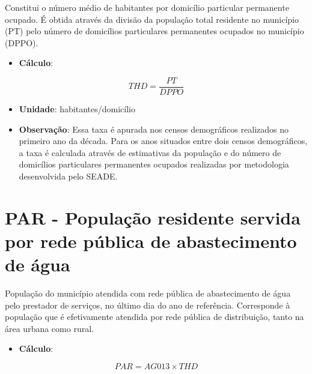 \documentclass[]{book}
\providecommand{\tightlist}{%
  \setlength{\itemsep}{0pt}\setlength{\parskip}{0pt}}
\begin{document}
Constitui o número médio de habitantes por domicílio particular permanente ocupado. É obtida através da divisão da população total residente no município (PT) pelo número de domicílios particulares permanentes ocupados no município (DPPO).

\begin{itemize}
\tightlist
\item
  \textbf{Cálculo}:
\end{itemize}

\[
THD = \frac{PT}{DPPO}
\]

\begin{itemize}
\item
  \textbf{Unidade}: habitantes/domicílio
\item
  \textbf{Observação}: Essa taxa é apurada nos censos demográficos realizados no primeiro ano da década. Para os anos situados entre dois censos demográficos, a taxa é calculada através de estimativas da população e do número de domicílios particulares permanentes ocupados realizadas por metodologia desenvolvida pelo SEADE.
\end{itemize}

\hypertarget{par---populauxe7uxe3o-residente-servida-por-rede-puxfablica-de-abastecimento-de-uxe1gua}{%
\section*{PAR - População residente servida por rede pública de abastecimento de água}\label{par---populauxe7uxe3o-residente-servida-por-rede-puxfablica-de-abastecimento-de-uxe1gua}}

População do município atendida com rede pública de abastecimento de água pelo prestador de serviços, no último dia do ano de referência. Corresponde à população que é efetivamente atendida por rede pública de distribuição, tanto na área urbana como rural.

\begin{itemize}
\tightlist
\item
  \textbf{Cálculo}:
\end{itemize}

\[
PAR = AG013 \times THD
\]
\end{document}
